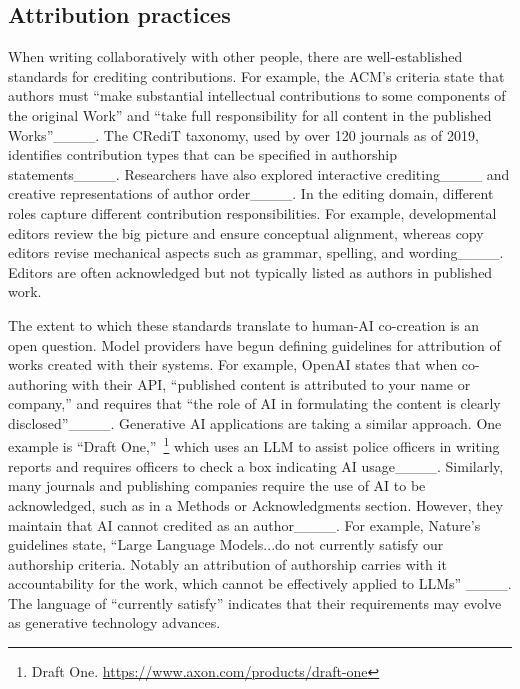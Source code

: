 \subsection{Attribution practices}
\label{sec:attribution-practices}

When writing collaboratively with other people, there are well-established standards for crediting contributions. For example, the ACM's criteria state that authors must ``make substantial intellectual contributions to some components of the original Work'' and ``take full responsibility for all content in the published Works''____. The CRediT taxonomy, used by over 120 journals as of 2019, identifies contribution types that can be specified in authorship statements____. Researchers have also explored interactive crediting____ and creative representations of author order____. In the editing domain, different roles capture different contribution responsibilities. For example, developmental editors review the big picture and ensure conceptual alignment, whereas copy editors revise mechanical aspects such as grammar, spelling, and wording____. Editors are often acknowledged but not typically listed as authors in published work.

The extent to which these standards translate to human-AI co-creation is an open question. Model providers have begun defining guidelines for attribution of works created with their systems. For example, OpenAI states that when co-authoring with their API, ``published content is attributed to your name or company,'' and requires that ``the role of AI in formulating the content is clearly disclosed''____. Generative AI applications are taking a similar approach. One example is ``Draft One,''~\footnote{Draft One. \url{https://www.axon.com/products/draft-one}} which uses an LLM to assist police officers in writing reports and requires officers to check a box indicating AI usage____. Similarly, many journals and publishing companies require the use of AI to be acknowledged, such as in a Methods or Acknowledgments section. However, they maintain that AI cannot credited as an author____. For example, Nature's guidelines state, ``Large Language Models...do not currently satisfy our authorship criteria. Notably an attribution of authorship carries with it accountability for the work, which cannot be effectively applied to LLMs'' ____. The language of ``currently satisfy'' indicates that their requirements may evolve as generative technology advances. 

